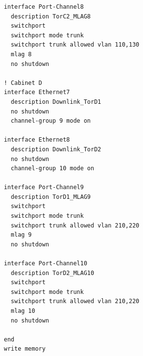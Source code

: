 \begin{lstlisting}[caption={EoR 1: downlinks to ToR switches.},basicstyle=\ttfamily\footnotesize,breaklines=true]
interface Port-Channel8
  description TorC2_MLAG8
  switchport
  switchport mode trunk
  switchport trunk allowed vlan 110,130
  mlag 8
  no shutdown

! Cabinet D
interface Ethernet7
  description Downlink_TorD1
  no shutdown
  channel-group 9 mode on

interface Ethernet8
  description Downlink_TorD2
  no shutdown
  channel-group 10 mode on

interface Port-Channel9
  description TorD1_MLAG9
  switchport
  switchport mode trunk
  switchport trunk allowed vlan 210,220
  mlag 9
  no shutdown

interface Port-Channel10
  description TorD2_MLAG10
  switchport
  switchport mode trunk
  switchport trunk allowed vlan 210,220
  mlag 10
  no shutdown

end
write memory
\end{lstlisting}

